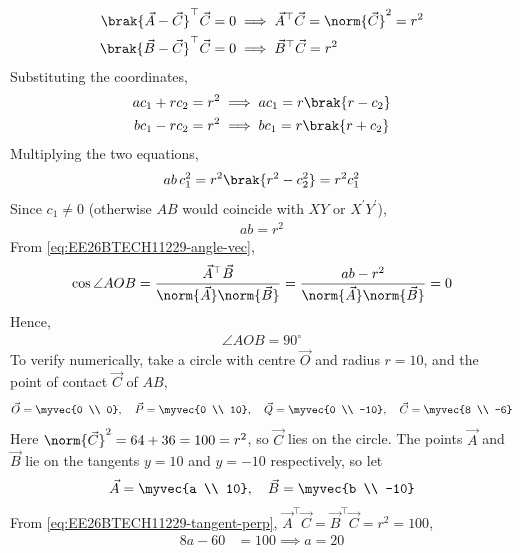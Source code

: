 \begin{enumerate}[label=\thesubsection.\arabic*, ref=\thesubsection.\theenumi]
\begin{align}
	\brak{\vec{A}-\vec{C}}^{\top}\vec{C} = 0 &\implies \vec{A}^{\top}\vec{C} = \norm{\vec{C}}^2 = r^2
	\\
	\brak{\vec{B}-\vec{C}}^{\top}\vec{C} = 0 &\implies \vec{B}^{\top}\vec{C} = r^2
\end{align}
Substituting the coordinates,
\begin{align}
	a c_1 + r c_2 &= r^2 \implies a c_1 = r\brak{r - c_2}
	\\
	b c_1 - r c_2 &= r^2 \implies b c_1 = r\brak{r + c_2}
\end{align}
Multiplying the two equations,
\begin{align}
	ab\,c_1^2 = r^2\brak{r^2 - c_2^2} = r^2 c_1^2
\end{align}
Since $c_1 \neq 0$ (otherwise $AB$ would coincide with $XY$ or $X^{\prime}Y^{\prime}$),
\begin{align}
	ab = r^2
\end{align}
From \eqref{eq:EE26BTECH11229-angle-vec},
\begin{align}
	\cos\angle AOB = \frac{\vec{A}^{\top}\vec{B}}{\norm{\vec{A}}\norm{\vec{B}}}
	= \frac{ab - r^2}{\norm{\vec{A}}\norm{\vec{B}}} = 0
\end{align}
Hence,
\begin{align}
	\angle AOB = 90^{\circ}
\end{align}
To verify numerically, take a circle with centre $\vec{O}$ and radius $r = 10$, and the point of contact $\vec{C}$ of $AB$,
\begin{align}
	\vec{O} = \myvec{0 \\ 0}, \quad \vec{P} = \myvec{0 \\ 10}, \quad \vec{Q} = \myvec{0 \\ -10}, \quad \vec{C} = \myvec{8 \\ -6}
\end{align}
Here $\norm{\vec{C}}^2 = 64 + 36 = 100 = r^2$, so $\vec{C}$ lies on the circle. The points $\vec{A}$ and $\vec{B}$ lie on the tangents $y = 10$ and $y = -10$ respectively, so let
\begin{align}
	\vec{A} = \myvec{a \\ 10}, \quad \vec{B} = \myvec{b \\ -10}
\end{align}
From \eqref{eq:EE26BTECH11229-tangent-perp}, $\vec{A}^{\top}\vec{C} = \vec{B}^{\top}\vec{C} = r^2 = 100$,
\begin{align}
	8a - 60 &= 100 \implies a = 20
	\\

\end{align}
\end{enumerate}
